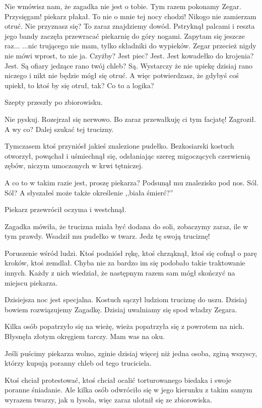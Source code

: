 \begin{dialogue}		
	\ds{} Nie wmówisz nam, że zagadka nie jest o tobie. Tym razem pokonamy Zegar.
	\ds{} Przysięgam! \dm{} 
		piekarz płakał. \dm{} 
		To nie o mnie tej nocy chodzi! Nikogo nie zamierzam otruć.
	\ds{} Nie przyznasz się? To zaraz znajdziemy dowód. \dm{} 
		Pstryknął palcami i reszta jego bandy zaczęła przewracać piekarnię do góry nogami. \ds{} 
		Zapytam się jeszcze raz...
	\ds{} ...nic trującego nie mam, tylko składniki do wypieków. Zegar przecież nigdy nie mówi wprost, to nie ja.
	\ds{} Czyżby? Jest piec? Jest. Jest kowadełko do krojenia? Jest. Są ofiary jedzące rano twój chleb? Są.
	\ds{} Wystarczy że nie upiekę dzisiaj rano niczego i nikt nie będzie mógł się otruć.
	\ds{} A więc potwierdzasz, że gdybyś coś upiekł, to ktoś by się otruł, tak?
	\ds{} Co to a logika?
\end{dialogue}
Szepty przeszły po zbiorowisku.
\begin{dialogue}
	\ds{} Nie pyskuj. \dm{} 
		Rozejrzał się nerwowo. \dm{} 
		Bo zaraz przewałkuję ci tym facjatę! \dm{} 
		Zagroził. \dm{} 
		A wy co? Dalej szukać tej trucizny.
\end{dialogue}
Tymczasem ktoś przyniósł jakieś znalezione pudełko.
Bezkosiarski kostuch otworzył, powąchał i uśmiechnął się, odsłaniając szereg migoczących czerwienią zębów, niczym umoczonych w krwi tętniczej.
\begin{dialogue}
	\ds{} A co to w takim razie jest, proszę piekarza? \dm{} Podsunął mu znalezisko pod nos.
	\ds{} Sól.
	\ds{} Sól? A słyszałeś może także określenie ,,biała śmierć?''
\end{dialogue}
Piekarz przewrócił oczyma i westchnął.
\begin{dialogue}
	\ds{} Zagadka mówiła, że trucizna miała być dodana do soli, zobaczymy zaraz, ile w tym prawdy. 
		\dm{} Wsadził mu pudełko w twarz. 
		\dm{} Jedz tę swoją truciznę!
\end{dialogue}
Poruszenie wśród ludzi.
Ktoś podniósł rękę, ktoś chrząknął, ktoś się cofnął o parę kroków, ktoś zemdlał.
Chyba nie za bardzo im się podobało takie traktowanie innych. Każdy z nich wiedział, że następnym razem sam mógł skończyć na miejscu piekarza.
\begin{dialogue}
	\ds{} Dzisiejsza noc jest specjalna. 
		\dm{} Kostuch sączył ludziom truciznę do uszu. 
		\dm{} Dzisiaj bowiem rozwiązujemy Zagadkę. Dzisiaj uwalniamy się spod władzy Zegara.
\end{dialogue}
Kilka osób popatrzyło się na wieżę, wieża popatrzyła się z powrotem na nich. Błysnęła złotym okręgiem tarczy. Mam was na oku.
\begin{dialogue}
	\ds{} Jeśli puścimy piekarza wolno, zginie dzisiaj więcej niż jedna osoba, zginą wszyscy, którzy kupują poranny chleb od tego truciciela.
\end{dialogue}
Ktoś chciał protestować, ktoś chciał ocalić torturowanego biedaka i swoje poranne śniadanie.
Ale kilka osób odwróciło się w jego kierunku z takim samym wyrazem twarzy, jak u łysola, więc zaraz ulotnił się ze zbiorowiska.

